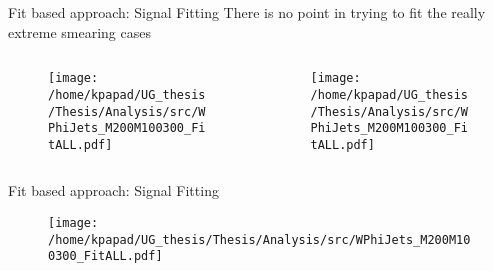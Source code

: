 \documentclass[bigger]{beamer}
\begin{document}
\begin{frame}[label={sec:orgdba85a0}]{Fit based approach: Signal Fitting}
There is no point in trying to fit the really extreme smearing cases
\begin{columns}
\begin{column}{0.5\columnwidth}
\begin{figure}[h]
\centering
\texttt{[image: /home/kpapad/UG\_thesis/Thesis/Analysis/src/WPhiJets\_M200M100300\_FitALL.pdf]}
\end{figure}
\end{column}

\begin{column}{0.5\columnwidth}
\begin{figure}[h]
\centering
\texttt{[image: /home/kpapad/UG\_thesis/Thesis/Analysis/src/WPhiJets\_M200M100300\_FitALL.pdf]}
\end{figure}
\end{column}
\end{columns}
\end{frame}

\begin{frame}[label={sec:orga2f1f02}]{Fit based approach: Signal Fitting}
\begin{figure}[h]
\centering
\texttt{[image: /home/kpapad/UG\_thesis/Thesis/Analysis/src/WPhiJets\_M200M100300\_FitALL.pdf]}
\end{figure}
\end{frame}
\end{document}
